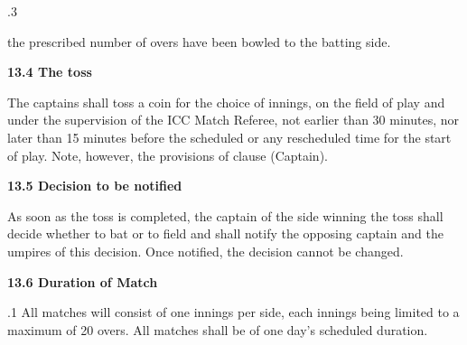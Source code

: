 \documentclass[12pt]{article}
\begin{document}
\vspace{\baselineskip}
{\fontsize{9pt}{10.8pt}.3 \tabto{0.49in} {\fontsize{8pt}{9.6pt}\selectfont the prescribed number of overs have been bowled to the batting side.\par}\par}\par


\vspace{\baselineskip}
{\fontsize{11pt}{13.2pt}\selectfont \textbf{13.4 \tabto{0.47in} The toss}\par}\par


\vspace{\baselineskip}
\begin{adjustwidth}{0.0in}{0.11in}
{\fontsize{9pt}{10.8pt}\selectfont The captains shall toss a coin for the choice of innings, on the field of play and under the supervision of the ICC Match Referee, not earlier than 30 minutes, nor later than 15 minutes before the scheduled or any rescheduled time for the start of play. Note, however, the provisions of clause (Captain).\par}\par

\end{adjustwidth}


\vspace{\baselineskip}
{\fontsize{11pt}{13.2pt}\selectfont \textbf{13.5 \tabto{0.47in} Decision to be notified}\par}\par


\vspace{\baselineskip}
\begin{adjustwidth}{0.0in}{0.14in}
{\fontsize{8pt}{9.6pt}\selectfont As soon as the toss is completed, the captain of the side winning the toss shall decide whether to bat or to field and shall notify the opposing captain and the umpires of this decision. Once notified, the decision cannot be changed.\par}\par

\end{adjustwidth}


\vspace{\baselineskip}
{\fontsize{11pt}{13.2pt}\selectfont \textbf{13.6 \tabto{0.47in} Duration of Match}\par}\par


\vspace{\baselineskip}
\begin{adjustwidth}{0.5in}{0.24in}
{\fontsize{9pt}{10.8pt}.1 \tabto{0.49in} All matches will consist of one innings per side, each innings being limited to a maximum of 20 overs. All matches shall be of one day’s scheduled duration.\par}\par

\end{adjustwidth}
\end{document}
